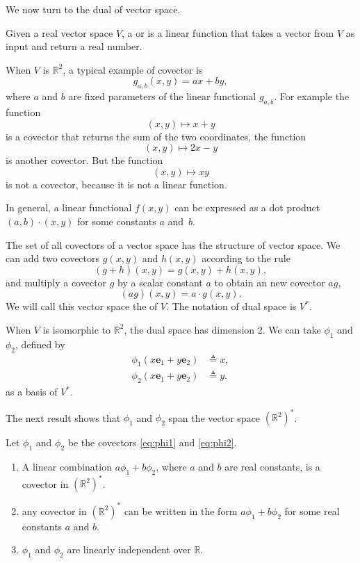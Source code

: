 We now turn to the dual of vector space.

\begin{svgraybox}
	\begin{definition}
	Given a real vector space $V$, a   or  is a linear function that takes a vector from $V$ as input and return a real number.
	\end{definition}
\end{svgraybox}
 When $V$ is $\mathbb{R}^2$, a typical example of covector is
$$
g_{a,b}(x,y) = ax+by,
$$
where $a$ and $b$ are fixed parameters of the linear functional $g_{a,b}$. For example the function
$$
(x,y) \mapsto x+y
$$
is a covector that returns the sum of the two coordinates, the function
$$
(x,y) \mapsto 2x-y
$$
is another covector. But the function
$$
(x,y)\mapsto xy
$$
is not a covector, because it is not a linear function.

In general, a linear functional $f(x,y)$ can be expressed as a dot product $(a,b)\cdot(x,y)$ for some constants $a$ and~$b$.

The set of all covectors of a vector space has the structure of vector space. We can add two covectors $g(x,y)$ and $h(x,y)$ according to the rule
$$
(g+h) (x,y) = g(x,y)+h(x,y),
$$
and multiply a covector $g$ by a scalar constant $a$ to obtain an new covector $ag$,
$$
(ag)(x,y) = a\cdot g(x,y).
$$
We will call this vector space the  of $V$. The notation of dual space is $V^*$.


When $V$ is isomorphic to $\mathbb{R}^2$, the dual space has dimension 2. We can take $\phi_1$ and $\phi_2$, defined by
\begin{align}
	\phi_1(x\mathbf{e}_1 + y\mathbf{e}_2) & \triangleq  x,
	\label{eq:phi1} \\
	\phi_2(x\mathbf{e}_1 + y\mathbf{e}_2) &\triangleq  y.
	\label{eq:phi2}
\end{align}
as a basis of $V^*$.

The next result shows that $\phi_1$ and $\phi_2$ span the vector space $(\mathbb{R}^2)^*$.

\begin{svgraybox}
	\begin{theorem} \label{thm:dual_space}
		Let $\phi_1$ and $\phi_2$ be the covectors \eqref{eq:phi1} and \eqref{eq:phi2}. 
		\begin{enumerate}
	\item	A linear combination
		$a\phi_1 + b \phi_2$, where $a$ and $b$ are real constants, is a covector in $(\mathbb{R}^2)^*$. 
	\item any covector in $(\mathbb{R}^2)^*$ can be written in the form $a\phi_1+b\phi_2$ for some real constants $a$ and $b$.
	\item $\phi_1$ and $\phi_2$ are linearly independent over $\mathbb{R}$.
		\end{enumerate}
		\end{theorem}
\end{svgraybox}

